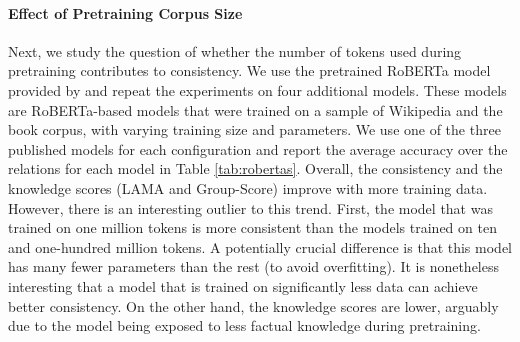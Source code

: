 













\paragraph{Effect of Pretraining Corpus Size}
Next, we study the question of whether the number of tokens used during pretraining contributes to consistency.
We use the pretrained RoBERTa model provided by \citet{robertas} and repeat the experiments on four additional models.
These models are RoBERTa-based models that were trained on a sample of Wikipedia and the book corpus, with varying training size and parameters. We use one of the three published models for each configuration and report the average accuracy over the relations for each model in Table \ref{tab:robertas}.
Overall, the consistency and the knowledge scores (LAMA and
Group-Score) improve
with more training data.
However, there is an interesting outlier to this trend.
First, the model that was trained on one million tokens is
more consistent than the models trained on ten and
one-hundred million tokens. A potentially crucial difference
is that this model
has many fewer parameters than the rest (to avoid overfitting). It is nonetheless interesting that a model that is trained on significantly less data can achieve better consistency. On the other hand, the knowledge scores are lower, arguably due to the model being exposed to less factual knowledge during pretraining.

